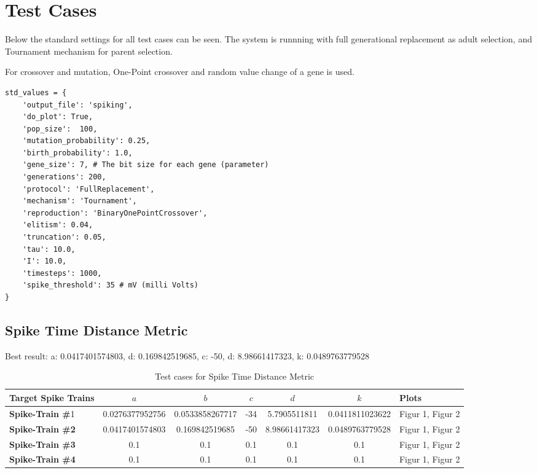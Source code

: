 \section{Test Cases}

Below the standard settings for all test cases can be seen. The system is runnning
with full generational replacement as adult selection, and Tournament mechanism for
parent selection.

For crossover and mutation, One-Point crossover and random value change of a gene is used. 

\begin{lstlisting}[frame=single,caption={Default values for all params}] 
std_values = {
    'output_file': 'spiking',
    'do_plot': True,
    'pop_size':  100,
    'mutation_probability': 0.25,
    'birth_probability': 1.0,
    'gene_size': 7, # The bit size for each gene (parameter)
    'generations': 200,
    'protocol': 'FullReplacement',
    'mechanism': 'Tournament',
    'reproduction': 'BinaryOnePointCrossover',
    'elitism': 0.04,
    'truncation': 0.05,
    'tau': 10.0,
    'I': 10.0,
    'timesteps': 1000,
    'spike_threshold': 35 # mV (milli Volts)
}
\end{lstlisting}

\subsection{Spike Time Distance Metric}
Best result: a: 0.0417401574803, d: 0.169842519685, c: -50, d: 8.98661417323, k: 0.0489763779528

\begin{table}[H]
	\begin{center}
		\begin{tabular}{ | l | c | c | c | c | c | l |}
	
	    \hline
	    
	  	\textbf{Target Spike Trains} & \textbf{$a$} & \textbf{$b$} & \textbf{$c$} & \textbf{$d$} & \textbf{$k$} & \textbf{Plots} \\ \hline
	  	\textbf{Spike-Train \#}1 & 0.0276377952756 & 0.0533858267717 & -34 & 5.7905511811 & 0.0411811023622 & Figur 1, Figur 2 \\ \hline
	  	\textbf{Spike-Train \#2} & 0.0417401574803 & 0.169842519685 & -50 & 8.98661417323 & 0.0489763779528 & Figur 1, Figur 2 \\ \hline
	  	\textbf{Spike-Train \#3} & 0.1 & 0.1 & 0.1 & 0.1 & 0.1 & Figur 1, Figur 2 \\ \hline
	  	\textbf{Spike-Train \#4} & 0.1 & 0.1 & 0.1 & 0.1 & 0.1 & Figur 1, Figur 2 \\  \hline
	  	
	    \end{tabular}
	
	\end{center}
    \caption{Test cases for Spike Time Distance Metric}
\end{table}


